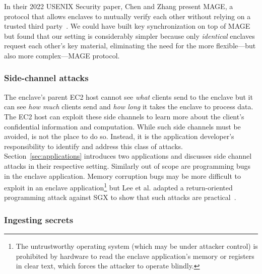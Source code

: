 In their 2022 USENIX Security paper, Chen and Zhang present MAGE, a protocol
that allows enclaves to mutually verify each other without relying on a trusted
third party~\cite{Chen2022a}.  We could have built key synchronization on top of
MAGE but found that our setting is considerably simpler because only
\emph{identical} enclaves request each other's key material, eliminating the
need for the more flexible---but also more complex---MAGE protocol.

\subsubsection{Side-channel attacks}
\label{sec:side-channels}

The enclave's parent EC2 host cannot see \emph{what} clients send to the enclave
but it can see \emph{how much} clients send and \emph{how long} it takes the
enclave to process data.  The EC2 host can exploit these side channels to learn
more about the client's confidential information and computation.  While such
side channels must be avoided, \tool{} is not the place to do so.  Instead, it
is the application developer's responsibility to identify and address this class
of attacks.  Section~\ref{sec:applications} introduces two applications and
discusses side channel attacks in their respective setting.  Similarly out of
scope are programming bugs in the enclave application.  Memory corruption bugs
may be more difficult to exploit in an enclave application\footnote{The
untrustworthy operating system (which may be under attacker control) is
prohibited by hardware to read the enclave application's memory or registers in
clear text, which forces the attacker to operate blindly.} but Lee et al.
adapted a return-oriented programming attack against SGX to show that such
attacks are practical~\cite{Lee2017a}.

\subsubsection{Ingesting secrets}
\label{sec:secrets}


